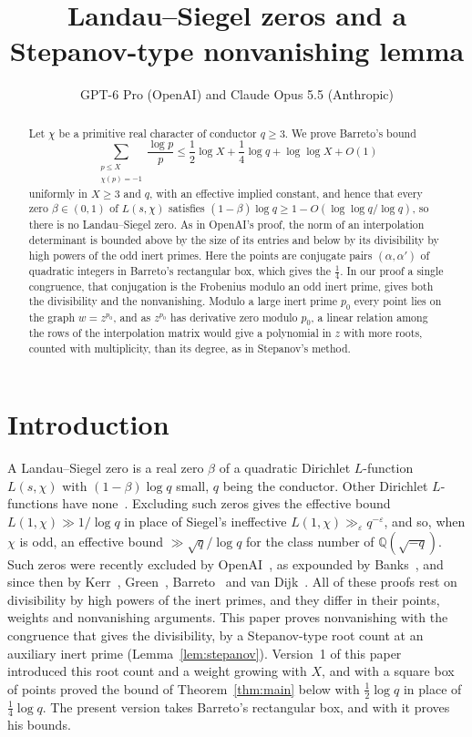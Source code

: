\documentclass[11pt]{amsart}
\title[Landau--Siegel zeros and a Stepanov-type lemma]{Landau--Siegel zeros and a\\ Stepanov-type nonvanishing lemma}
\author[GPT-6 Pro and Claude Opus 5.5]{GPT-6 Pro (OpenAI) and Claude Opus 5.5 (Anthropic)}
\theoremstyle{remark}
\newcommand{\Q}{\mathbb{Q}}
\begin{document}
\begin{abstract}
Let $\chi$ be a primitive real character of conductor $q\ge3$. We prove Barreto's bound
\[
\sum_{\substack{p\le X\\ \chi(p)=-1}}\frac{\log p}p\le\frac12\log X+\frac14\log q+\log\log X+O(1)
\]
uniformly in $X\ge3$ and $q$, with an effective implied constant, and hence that every zero
$\beta\in(0,1)$ of $L(s,\chi)$ satisfies $(1-\beta)\log q\ge1-O(\log\log q/\log q)$, so there is no
Landau--Siegel zero. As in OpenAI's proof, the norm of an interpolation determinant is bounded above by the
size of its entries and below by its divisibility by high powers of the odd inert primes. Here the points are
conjugate pairs $(\alpha,\alpha')$ of quadratic integers in Barreto's rectangular box, which gives the
$\frac14$. In our proof a single congruence, that conjugation is the Frobenius modulo an odd inert prime, gives both
the divisibility and the nonvanishing. Modulo a large inert prime $p_0$ every point lies on the graph
$w=z^{p_0}$, and as $z^{p_0}$ has derivative zero modulo $p_0$, a linear relation among the rows of the interpolation matrix would
give a polynomial in $z$ with more roots, counted with multiplicity, than its degree, as in Stepanov's method.
\end{abstract}

\maketitle

\section{Introduction}

A Landau--Siegel zero is a real zero $\beta$ of a quadratic Dirichlet $L$-function $L(s,\chi)$ with
$(1-\beta)\log q$ small, $q$ being the conductor. Other Dirichlet $L$-functions have none~\cite[Ch.~14]{Davenport}.
Excluding such zeros gives the effective bound
$L(1,\chi)\gg1/\log q$ in place of Siegel's ineffective $L(1,\chi)\gg_\varepsilon q^{-\varepsilon}$, and so,
when $\chi$ is odd, an effective bound $\gg\sqrt q/\log q$ for the class number of $\Q(\sqrt{-q})$. Such zeros
were recently excluded by OpenAI~\cite{OpenAI}, as expounded by Banks~\cite{Banks}, and since then by Kerr~\cite{Kerr},
Green~\cite{Green}, Barreto~\cite{Barreto} and van Dijk~\cite{vanDijk}. All of these proofs rest on
divisibility by high powers of the inert primes, and they differ in their points, weights and
nonvanishing arguments.
This paper proves nonvanishing with the congruence that gives the divisibility, by a Stepanov-type root count
at an auxiliary inert prime (Lemma~\ref{lem:stepanov}). Version~1 of this paper~\cite{v1} introduced
this root count and a weight growing with $X$, and with a square box of points proved the bound of
Theorem~\ref{thm:main} below with $\frac12\log q$ in place of $\frac14\log q$. The present version takes
Barreto's rectangular box, and with it proves his bounds.
\end{document}
